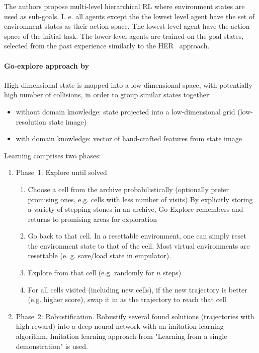 \documentclass[acmsmall, nonacm]{acmart}
\begin{document}
The authors propose multi-level hierarchical RL where environment states are used as sub-goals. I. e. all agents except the the lowest level agent have the set of environment states as their action space. The lowest level agent have the action space of the initial task. The lower-level agents are trained on the goal states, selected from the past experience similarly to the HER~\cite{andrychowicz_hindsight_2017} approach.


\paragraph{Go-explore approach by~\citet{ecoffet_first_2021}} %
\label{par:go-explore}

High-dimensional state is mapped into a low-dimensional space, with potentially high number of collisions, in order to group similar states together:
\begin{itemize}
    \item without domain knowledge: state projected into a low-dimensional grid (low-resolution state image)
    \item with domain knowledge: vector of hand-crafted features from state image
\end{itemize}

Learning comprises two phases:
\begin{enumerate}
    \item Phase~1: Explore until solved
    \begin{enumerate}
      \item Choose a cell from the archive probabilistically (optionally prefer promising ones, e.g. cells with less number of visits)
    By explicitly storing a variety of stepping stones in an archive, Go-Explore remembers and returns to promising areas for exploration
      \item Go back to that cell. In a resettable environment, one can simply reset the environment state to that of the cell. Most virtual environments are resettable (e. g. save/load state in empulator).
      \item Explore from that cell (e.g. randomly for $n$ steps)
      \item For all cells visited (including new cells), if the new trajectory is better (e.g. higher score), swap it in as the trajectory to reach that cell
    \end{enumerate}

    \item Phase~2: Robustification. Robustify several found solutions (trajectories with high reward) into a deep neural network with an imitation learning algorithm. Imitation learning approach from "Learning from a single demonstration" is used.
\end{enumerate}
\end{document}
